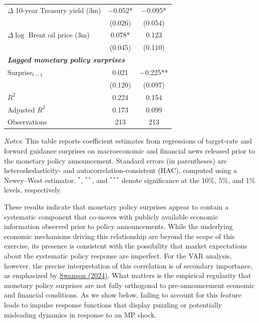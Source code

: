 \documentclass[12pt, reqno]{article}
\begin{document}
\begin{table}[t]
{\begin{tabular}{lcc}
$\Delta$ 10-year Treasury yield (3m)  
& $-$0.052* 
& $-$0.095*  \\
& (0.026) 
& (0.054) \\

$\Delta \log$ Brent oil price (3m)       
& 0.078* 
& 0.123  \\
& (0.045) 
& (0.110) \\[0.4em]

\multicolumn{3}{l}{\textbf{\emph{Lagged monetary policy surprises}}} \\[0.2em]
Surprise$_{t-1}$                      
& 0.021  
& $-$0.225** \\
& (0.120)  
& (0.097) \\[0.4em]

\midrule
$R^2$              & 0.224 & 0.154 \\
Adjusted $R^2$     & 0.173 & 0.099 \\
Observations       & 213   & 213   \\
\bottomrule
\end{tabular}}
\begin{flushleft}
\footnotesize
\parbox{0.95\textwidth}{
\textit{Notes}: This table reports coefficient estimates from regressions of target-rate and forward guidance surprises on macroeconomic and financial news released prior to the monetary policy announcement. Standard errors (in parentheses) are heteroskedasticity- and autocorrelation-consistent (HAC), computed using a Newey--West estimator. $^{*}$, $^{**}$, and $^{***}$ denote significance at the 10\%, 5\%, and 1\% levels, respectively.
}
\end{flushleft}
\end{table}

These results indicate that monetary policy surprises appear to contain a systematic component that co-moves with publicly available economic information observed prior to policy announcements. While the underlying economic mechanisms driving this relationship are beyond the scope of this exercise, its presence is consistent with the possibility that market expectations about the systematic policy response are imperfect. For the VAR analysis, however, the precise interpretation of this correlation is of secondary importance, as emphasized by \hyperlink{Swanson (2024)}{Swanson (2024)}. What matters is the empirical regularity that monetary policy surprises are not fully orthogonal to pre-announcement economic and financial conditions. As we show below, failing to account for this feature leads to impulse response functions that display puzzling or potentially misleading dynamics in response to an MP shock.
\end{document}
